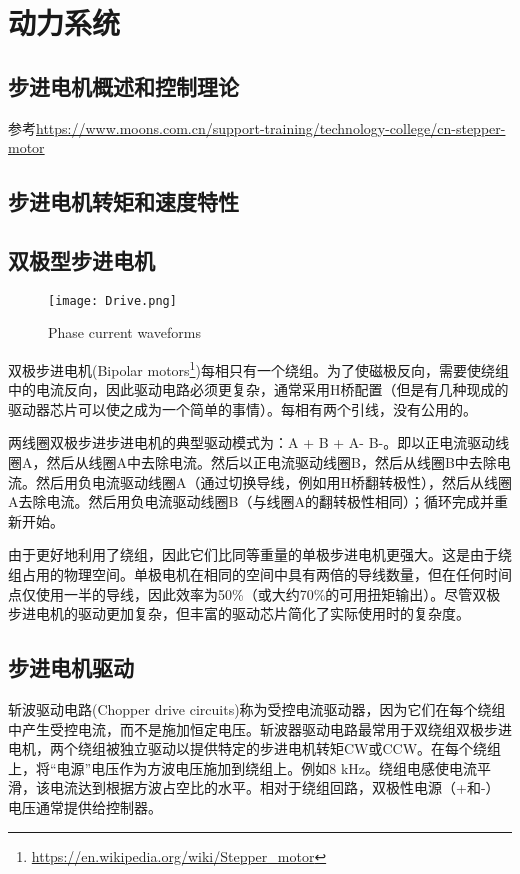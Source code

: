 \chapter{动力系统}
\label{cha:Motor}

\section{步进电机概述和控制理论}


参考\url{https://www.moons.com.cn/support-training/technology-college/cn-stepper-motor}

\section{步进电机转矩和速度特性}


\section{双极型步进电机}

\begin{figure}[htbp]
    \centering
    \texttt{[image: Drive.png]}
    \caption{Phase current waveforms}
    \label{fig:Phase-current}
\end{figure}

双极步进电机(Bipolar motors\footnote{\url{https://en.wikipedia.org/wiki/Stepper_motor}})每相只有一个绕组。为了使磁极反向，需要使绕组中的电流反向，因此驱动电路必须更复杂，通常采用H桥配置（但是有几种现成的驱动器芯片可以使之成为一个简单的事情）。每相有两个引线，没有公用的。

两线圈双极步进步进电机的典型驱动模式为：A + B + A- B-。即以正电流驱动线圈A，然后从线圈A中去除电流。然后以正电流驱动线圈B，然后从线圈B中去除电流。然后用负电流驱动线圈A（通过切换导线，例如用H桥翻转极性），然后从线圈A去除电流。然后用负电流驱动线圈B（与线圈A的翻转极性相同）；循环完成并重新开始。

由于更好地利用了绕组，因此它们比同等重量的单极步进电机更强大。这是由于绕组占用的物理空间。单极电机在相同的空间中具有两倍的导线数量，但在任何时间点仅使用一半的导线，因此效率为50\%（或大约70\%的可用扭矩输出）。尽管双极步进电机的驱动更加复杂，但丰富的驱动芯片简化了实际使用时的复杂度。

\section{步进电机驱动}

斩波驱动电路(Chopper drive circuits)称为受控电流驱动器，因为它们在每个绕组中产生受控电流，而不是施加恒定电压。斩波器驱动电路最常用于双绕组双极步进电机，两个绕组被独立驱动以提供特定的步进电机转矩CW或CCW。在每个绕组上，将“电源”电压作为方波电压施加到绕组上。例如8 kHz。绕组电感使电流平滑，该电流达到根据方波占空比的水平。相对于绕组回路，双极性电源（+和-）电压通常提供给控制器。

